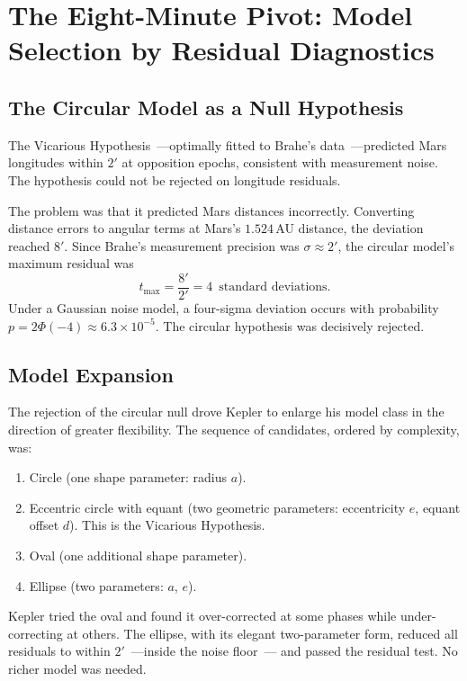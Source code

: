 \documentclass[12pt]{article}
\begin{document}
\section{The Eight-Minute Pivot: Model Selection by Residual Diagnostics}
\label{sec:8min}

\subsection{The Circular Model as a Null Hypothesis}

The Vicarious Hypothesis~---optimally fitted to Brahe's data~---predicted
Mars longitudes within $2'$ at opposition epochs, consistent with measurement
noise.  The hypothesis could not be rejected on longitude residuals.

The problem was that it predicted Mars distances incorrectly.
Converting distance errors to angular terms at Mars's $1.524$\,AU distance,
the deviation reached $8'$.  Since Brahe's measurement precision was $\sigma
\approx 2'$, the circular model's maximum residual was
\[
   t_{\max} = \frac{8'}{2'} = 4\,\text{ standard deviations}.
\]
Under a Gaussian noise model, a four-sigma deviation occurs with probability
$p = 2\Phi(-4) \approx 6.3\times10^{-5}$.  The circular hypothesis was
decisively rejected.

\subsection{Model Expansion}

The rejection of the circular null drove Kepler to enlarge his model class in
the direction of greater flexibility.
The sequence of candidates, ordered by complexity, was:
\begin{enumerate}
  \item Circle (one shape parameter: radius $a$).
  \item Eccentric circle with equant (two geometric parameters: eccentricity
        $e$, equant offset $d$).  This is the Vicarious Hypothesis.
  \item Oval (one additional shape parameter).
  \item Ellipse (two parameters: $a$, $e$).
\end{enumerate}
Kepler tried the oval and found it over-corrected at some phases while
under-correcting at others.  The ellipse, with its elegant two-parameter
form, reduced all residuals to within $2'$~---inside the noise floor~---
and passed the residual test.  No richer model was needed.
\end{document}

